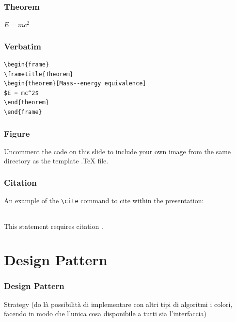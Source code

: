\documentclass[10pt]{beamer}
\begin{document}

\begin{frame}
\frametitle{Theorem}
\begin{theorem}
$E = mc^2$
\end{theorem}
\end{frame}


\begin{frame}[fragile] %
\frametitle{Verbatim}
\begin{example}
\begin{verbatim}
\begin{frame}
\frametitle{Theorem}
\begin{theorem}[Mass--energy equivalence]
$E = mc^2$
\end{theorem}
\end{frame}\end{verbatim}
\end{example}
\end{frame}


\begin{frame}
\frametitle{Figure}
Uncomment the code on this slide to include your own image from the same directory as the template .TeX file.
\end{frame}


\begin{frame}[fragile] %
\frametitle{Citation}
An example of the \verb|\cite| command to cite within the presentation:\\~

This statement requires citation \cite{p1}.
\end{frame}

\section{Design Pattern}
\begin{frame}
\frametitle{Design Pattern}
Strategy (do là possibilità di implementare con altri tipi di algoritmi i colori, facendo in modo che l'unica cosa disponibile a tutti sia l'interfaccia)

\end{frame}
\end{document}

